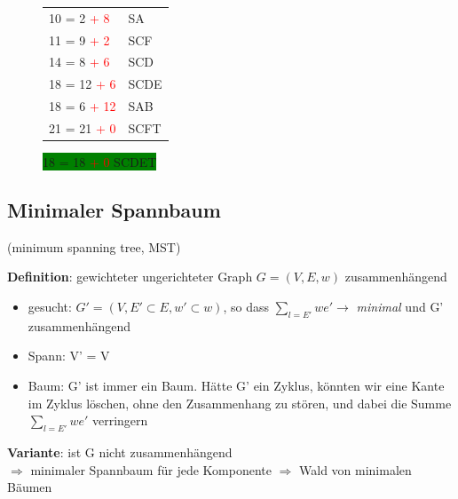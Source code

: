 \documentclass[11pt, fleqn]{scrreprt}
\begin{document}
\begin{figure}[htbp]
\begin{minipage}{4cm}
\begin{tabular}{L{2cm} | L{2cm}}
                10 = 2 \textcolor{red}{+ 8}  & SA\\
                11 = 9 \textcolor{red}{+ 2}  & SCF \\
                14 = 8 \textcolor{red}{+ 6}  & SCD \\
                18 = 12 \textcolor{red}{+ 6}  & SCDE \\
                18 = 6 \textcolor{red}{+ 12}  & SAB \\
                21 = 21 \textcolor{red}{+ 0}  & SCFT \\
            \end{tabular}
            \colorbox{green}{18 = 18  \textcolor{red}{+ 0} \hspace*{0.5cm} SCDET}
        \end{minipage}
    \end{figure}


    \subsection*{Minimaler Spannbaum} (minimum spanning tree, MST)\\

    \textbf{Definition}: gewichteter ungerichteter Graph $G = (V, E, w)$ zusammenhängend\\
    \begin{itemize}
        \item gesucht: $G' = (V, E' \subset E, w' \subset w)$, so dass $\sum\limits_{l = E'} we' \rightarrow$ \emph{minimal} und G' zusammenhängend
        \item \glqq Spann\grqq: V' = V
        \item \glqq Baum\grqq : G' ist immer ein Baum. Hätte G' ein Zyklus, könnten wir eine Kante im Zyklus löschen, ohne den Zusammenhang zu stören, und dabei die Summe $\sum\limits_{l=E'}we'$ verringern
    \end{itemize}

    \textbf{Variante}: ist G nicht zusammenhängend\\
    \hspace*{1cm} $\Rightarrow$ minimaler Spannbaum für jede Komponente $\Rightarrow$ Wald von minimalen Bäumen\\
\end{document}
